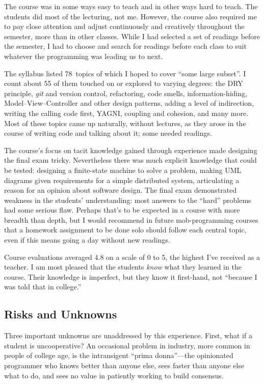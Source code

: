 \documentclass{article}
\begin{document}
The course was in some ways easy to teach and in other ways hard to teach.
The students did most of the lecturing, not me.
However, the course also required me to pay close attention
and adjust continuously and creatively throughout the semester, more than in
other classes. While I had selected a set of readings before the semester, I
had to choose and search for readings before each class to suit whatever the
programming was leading us to next.

The syllabus listed 78~topics of which I hoped to cover ``some large subset''.
I count about 55 of them touched on or explored to varying degrees: the DRY
principle, \emph{git} and version control, refactoring, code smells,
information-hiding,
Model--View--Controller and other design patterns, adding a level of
indirection, writing the calling code first, YAGNI, coupling and cohesion, and
many more. Most of these topics came up naturally, without lectures, as they
arose in the course of writing code and talking about it; some needed
readings.

The course's focus on tacit knowledge gained through experience made designing
the final exam tricky.  Nevertheless there was much explicit knowledge that
could be tested: designing a finite-state machine to solve a problem, making
UML diagrams given requirements for a simple distributed system, articulating a
reason for an opinion about software design. The final exam demonstrated
weakness in the students' understanding: most answers to the ``hard'' problems
had some serious flaw. Perhaps that's to be expected in a course with more
breadth than depth, but I would recommend in future mob-programming courses
that a homework assignment to be done solo should follow each central topic,
even if this means going a day without new readings.

Course evaluations averaged 4.8 on a scale of 0 to 5, the highest I've
received as a teacher.  I am most pleased that the students \emph{know} what
they learned in the course. Their knowledge is imperfect, but they know it
first-hand, not ``because I was told that in college.''

\subsection{Risks and Unknowns}

Three important unknowns are unaddressed by this experience. First, what if a
student is uncooperative? An occasional problem in industry, more common in
people of college age, is the intransigent ``prima donna''---the opinionated
programmer who knows better than anyone else, sees faster than anyone else
what to do, and sees no value in patiently working to build consensus.
\end{document}
